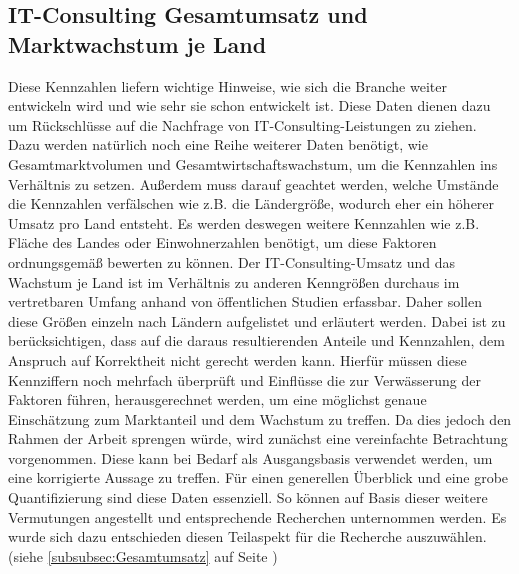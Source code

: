  \subsection{IT-Consulting Gesamtumsatz und Marktwachstum je Land}
 Diese Kennzahlen liefern wichtige Hinweise, wie sich die Branche weiter entwickeln wird und wie sehr sie schon entwickelt ist. 
 Diese Daten dienen dazu um Rückschlüsse auf die Nachfrage von IT-Consulting-Leistungen zu ziehen. 
 Dazu werden natürlich noch eine Reihe weiterer Daten benötigt, wie Gesamtmarktvolumen und Gesamtwirtschaftswachstum, um die Kennzahlen ins Verhältnis zu setzen.
  Außerdem muss darauf geachtet werden, welche Umstände die Kennzahlen verfälschen wie z.B. die Ländergröße, wodurch eher ein höherer Umsatz pro Land entsteht. 
  Es werden deswegen weitere Kennzahlen wie z.B. Fläche des Landes oder Einwohnerzahlen benötigt, um diese Faktoren ordnungsgemäß bewerten zu können.
 Der IT-Consulting-Umsatz und das Wachstum je Land ist im Verhältnis zu anderen Kenngrößen durchaus im vertretbaren Umfang anhand von öffentlichen Studien erfassbar.  
 Daher sollen diese Größen einzeln nach Ländern aufgelistet und erläutert werden. 
  Dabei ist zu berücksichtigen, dass auf die daraus resultierenden Anteile und Kennzahlen, dem Anspruch auf Korrektheit nicht gerecht werden kann. 
  Hierfür müssen diese Kennziffern noch mehrfach überprüft und Einflüsse die zur Verwässerung der Faktoren führen, herausgerechnet werden, um eine möglichst genaue Einschätzung zum Marktanteil und dem Wachstum zu treffen. Da dies jedoch den Rahmen der Arbeit sprengen würde, wird zunächst eine vereinfachte Betrachtung vorgenommen. Diese kann bei Bedarf als Ausgangsbasis  verwendet werden, um eine korrigierte Aussage zu treffen. 
  Für einen generellen Überblick und eine grobe Quantifizierung sind diese Daten essenziell. So können auf Basis dieser weitere Vermutungen angestellt und entsprechende Recherchen unternommen werden.
 Es wurde sich dazu entschieden diesen Teilaspekt für die Recherche auszuwählen. (siehe  \ref{subsubsec:Gesamtumsatz}  auf Seite \pageref{subsubsec:Gesamtumsatz})
 
